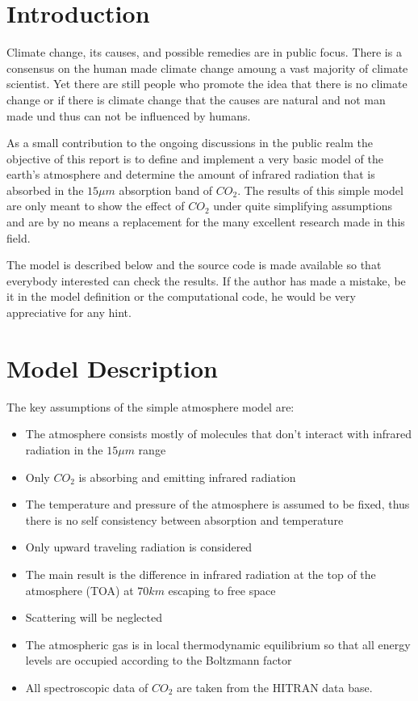 \section{Introduction}

Climate change, its causes, and possible remedies are in public focus. There is a consensus on the human made climate change amoung a vast majority of climate scientist. Yet there are still people who promote the idea that there is no climate change or if there is climate change that the causes are natural and not man made und thus can not be influenced by humans. 

As a small contribution to the ongoing discussions in the public realm the objective of this report is to define and implement a very basic model of the earth's atmosphere and determine the amount of infrared radiation that is absorbed in the $15 \mu m$ absorption band of $CO_2$. The results of this simple model are only meant to show the effect of $CO_2$ under quite simplifying assumptions and are by no means a replacement for the many excellent research made in this field.    

The model is described below and the source code is made available so that everybody interested can check the results. If the author has made a mistake, be it in the model definition or the computational code, he would be very appreciative for any hint.


\section{Model Description}

The key assumptions of the simple atmosphere model are:
\begin{itemize}
	\item The atmosphere consists mostly of molecules that don't interact with infrared radiation in the $15 \mu m$ range
	\item Only $CO_2$ is absorbing and emitting infrared radiation
	\item The temperature and pressure of the atmosphere is assumed to be fixed, thus there is no self consistency between absorption and temperature
	\item Only upward traveling radiation is considered  
	\item The main result is the difference in infrared radiation at the top of the atmosphere (TOA) at $70 km$ escaping to free space 
	\item Scattering will be neglected
	\item The atmospheric gas is in local thermodynamic equilibrium so that all energy levels are occupied according to 
	the Boltzmann factor
	\item All spectroscopic data of $CO_2$ are taken from the HITRAN data base. 
\end{itemize}


